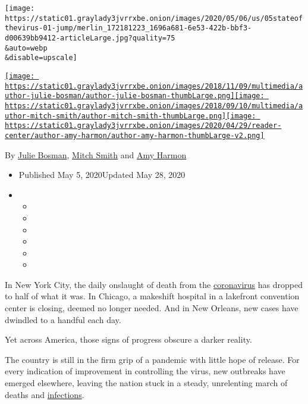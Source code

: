 \texttt{[image: https://static01.graylady3jvrrxbe.onion/images/2020/05/06/us/05stateofthevirus-01-jump/merlin\_172181223\_1696a681-6e53-422b-bbf3-d00639bb9412-articleLarge.jpg?quality=75\\\&auto=webp\\\&disable=upscale]}

\href{https://www.nytimes3xbfgragh.onion/by/julie-bosman}{\texttt{[image: https://static01.graylady3jvrrxbe.onion/images/2018/11/09/multimedia/author-julie-bosman/author-julie-bosman-thumbLarge.png]}}\href{https://www.nytimes3xbfgragh.onion/by/mitch-smith}{\texttt{[image: https://static01.graylady3jvrrxbe.onion/images/2018/09/10/multimedia/author-mitch-smith/author-mitch-smith-thumbLarge.png]}}\href{https://www.nytimes3xbfgragh.onion/by/amy-harmon}{\texttt{[image: https://static01.graylady3jvrrxbe.onion/images/2020/04/29/reader-center/author-amy-harmon/author-amy-harmon-thumbLarge-v2.png]}}

By \href{https://www.nytimes3xbfgragh.onion/by/julie-bosman}{Julie
Bosman}, \href{https://www.nytimes3xbfgragh.onion/by/mitch-smith}{Mitch
Smith} and \href{https://www.nytimes3xbfgragh.onion/by/amy-harmon}{Amy
Harmon}

\begin{itemize}
\item
  Published May 5, 2020Updated May 28, 2020
\item
  \begin{itemize}
  \item
  \item
  \item
  \item
  \item
  \item
  \end{itemize}
\end{itemize}

In New York City, the daily onslaught of death from the
\href{https://www.nytimes3xbfgragh.onion/2020/05/14/health/talking-coronavirus-infect.html}{coronavirus}
has dropped to half of what it was. In Chicago, a makeshift hospital in
a lakefront convention center is closing, deemed no longer needed. And
in New Orleans, new cases have dwindled to a handful each day.

Yet across America, those signs of progress obscure a darker reality.

The country is still in the firm grip of a pandemic with little hope of
release. For every indication of improvement in controlling the virus,
new outbreaks have emerged elsewhere, leaving the nation stuck in a
steady, unrelenting march of deaths and
\href{https://www.nytimes3xbfgragh.onion/2020/05/14/health/talking-coronavirus-infect.html}{infections}.

